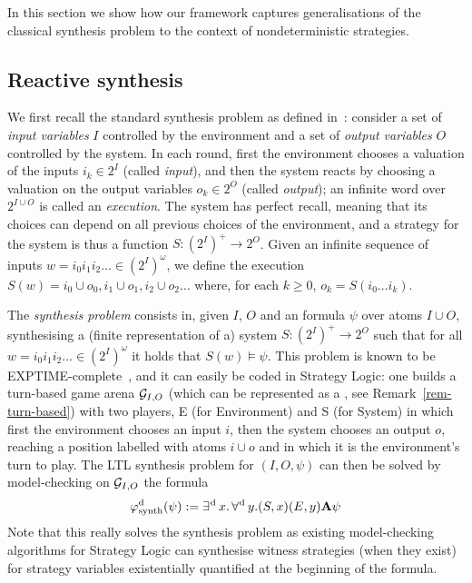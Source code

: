 In this section we show how our framework captures generalisations of
the classical \LTL synthesis problem to the context of nondeterministic strategies.

\subsection{Reactive synthesis}
\label{sec-ltl-synth}

We first recall the standard \LTL synthesis problem as defined
in~\cite{pnueli1989synthesisshort}: consider a set of \emph{input
  variables} $I$ controlled by the environment and a set of
\emph{output variables} $O$ controlled by the system. In each round,
first the environment chooses a valuation of the inputs $i_k\in 2^I$
(called \emph{input}), and then the system reacts by choosing a
valuation on the output variables $o_k\in 2^O$ (called \emph{output});
an infinite word over $2^{I\cup O}$ is called an
\emph{execution}. The system has perfect recall, meaning that its
choices can depend on all previous choices of the environment, and a
strategy for the system is thus a function $S:(2^I)^+\to 2^O$. Given
an infinite sequence of inputs $w=i_0i_1i_2\ldots \in (2^I)^\omega$, we
define the execution $S(w)=i_0\cup o_0, i_1\cup o_1, i_2\cup o_2\ldots$ where,
for each $k\geq 0$, $o_k=S(i_0\ldots i_k)$.

The \emph{\LTL synthesis problem} consists in,
given $I$, $O$ and an \LTL formula $\psi$ over atoms $I\cup O$,
synthesising a (finite representation of a) system $S:(2^I)^+\to 2^O$ such
that for all $w=i_0i_1i_2\ldots\in (2^I)^\omega$ it holds that $S(w)\models\psi$.
This problem is known to be
\2EXPTIME-complete~\cite{pnueli1989synthesisshort}, and it can easily
be coded in Strategy Logic: one builds a turn-based game arena $\CGS_{I,O}$ (which
can be represented as a \CGS, see Remark~\ref{rem-turn-based}) with
two players, E (for Environment) and S (for System) in
which first the environment chooses an input $i$, then the system chooses
an output $o$, reaching a position labelled with atoms $i\cup o$ and in which it is
the environment's turn to play. The LTL synthesis problem for $(I,O,\psi)$ can
then be solved by model-checking on $\CGS_{I,O}$ the \SLref formula
\[\varphi^{\text{d}}_{\text{synth}}(\psi):=\operatorname*{\exists^{\hskip.5pt\text{d}}} x.   \operatorname*{\forall^{\hskip.5pt\text{d}}} y.
 (S,x)(E,y) {\bf A} \psi\]
 Note that this really solves the synthesis
problem as existing model-checking algorithms for Strategy Logic can
synthesise  witness strategies (when they exist) for strategy variables existentially
quantified at the beginning of the formula.

